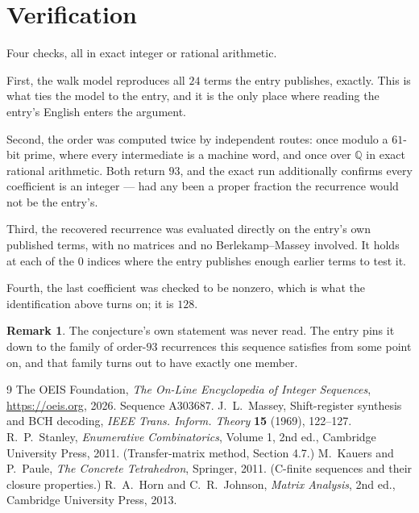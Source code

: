 \documentclass[11pt,a4paper]{article}
\theoremstyle{plain}
\theoremstyle{definition}
\newtheorem{remark}[theorem]{Remark}
\begin{document}
\section{Verification}

Four checks, all in exact integer or rational arithmetic.

First, the walk model reproduces all $24$ terms the entry publishes, exactly. This is
what ties the model to the entry, and it is the only place where reading the entry's English
enters the argument.

Second, the order was computed twice by independent routes: once modulo a $61$-bit prime, where
every intermediate is a machine word, and once over $\mathbb{Q}$ in exact rational arithmetic.
Both return $93$, and the exact run additionally confirms every coefficient is an integer
--- had any been a proper fraction the recurrence would not be the entry's.

Third, the recovered recurrence was evaluated directly on the entry's own published terms, with
no matrices and no Berlekamp--Massey involved. It holds at each of the $0$ indices where
the entry publishes enough earlier terms to test it.

Fourth, the last coefficient was checked to be nonzero, which is what the identification above
turns on; it is $128$.

\begin{remark}
The conjecture's own statement was never read. The entry pins it down to the family of
order-$93$ recurrences this sequence satisfies from some point on, and that family turns
out to have exactly one member.
\end{remark}

\begin{thebibliography}{9}
 The OEIS Foundation, \emph{The On-Line Encyclopedia of Integer
Sequences}, \url{https://oeis.org}, 2026. Sequence A303687.
 J.~L.~Massey, Shift-register synthesis and BCH decoding, \emph{IEEE
Trans. Inform. Theory} \textbf{15} (1969), 122--127.
 R.~P.~Stanley, \emph{Enumerative Combinatorics}, Volume 1, 2nd ed.,
Cambridge University Press, 2011. (Transfer-matrix method, Section 4.7.)
 M.~Kauers and P.~Paule, \emph{The Concrete Tetrahedron}, Springer, 2011.
(C-finite sequences and their closure properties.)
 R.~A.~Horn and C.~R.~Johnson, \emph{Matrix Analysis}, 2nd ed., Cambridge
University Press, 2013.
\end{thebibliography}
\end{document}
